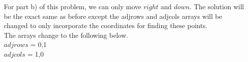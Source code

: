 \documentclass[11pt,fleqn]{article}
\begin{document}
For part b) of this problem, we can only move $right$ and $down$. The solution will be the exact same as before except the adjrows and adjcols arrays will be changed to only incorporate the coordinates for finding these points.\\

The arrays change to the following below.\\

$adjrows$ = {0,1}\\

$adjcols$ = {1,0}\\
\end{document}
